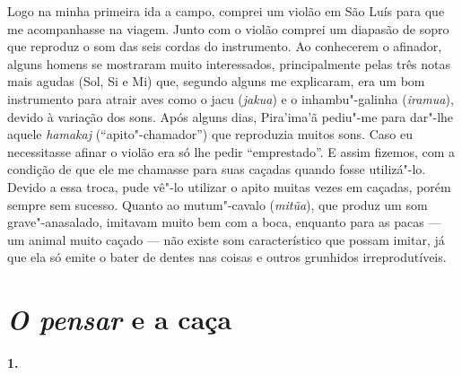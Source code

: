 Logo na minha primeira ida a campo, comprei um violão em São Luís para
que me acompanhasse na viagem. Junto com o violão comprei um diapasão de
sopro que reproduz o som das seis cordas do instrumento. Ao conhecerem o
afinador, alguns homens se mostraram muito interessados, principalmente
pelas três notas mais agudas (Sol, Si e Mi) que, segundo alguns me
explicaram, era um bom instrumento para atrair aves como o jacu
(\emph{jakua}) e o inhambu"-galinha (\emph{iramua}), devido à variação
dos sons. Após alguns dias, Pira'ima'ã pediu"-me para dar"-lhe aquele
\emph{hamakaj} (``apito"-chamador'') que reproduzia muitos sons. Caso eu
necessitasse afinar o violão era só lhe pedir ``emprestado''. E assim
fizemos, com a condição de que ele me chamasse para suas caçadas quando
fosse utilizá"-lo. Devido a essa troca, pude vê"-lo utilizar o apito
muitas vezes em caçadas, porém sempre sem sucesso. Quanto ao
mutum"-cavalo (\emph{mitũa}), que produz um som grave"-anasalado, imitavam
muito bem com a boca, enquanto para as pacas --- um animal muito caçado ---
não existe som característico que possam imitar, já que ela só emite o
bater de dentes nas coisas e outros grunhidos irreprodutíveis.

\section{\emph{O pensar} e a caça}

\paragraph{1.}

